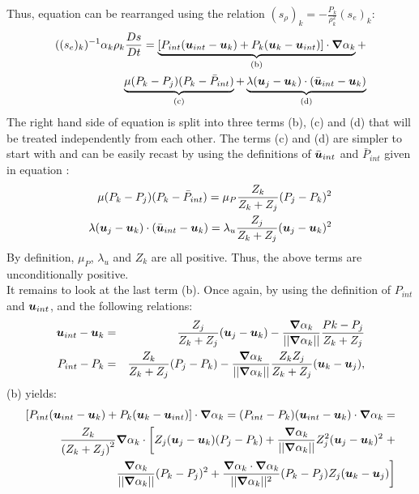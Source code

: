 Thus, equation  can be rearranged using the relation $(s_\rho)_k = - \frac{P_k}{\rho_k^2} (s_e)_k$:
\begin{eqnarray}
\label{eq:ent3}
((s_e)_k)^{-1} \alpha_k \rho_k \frac{Ds}{Dt} = \underbrace{\left[ P_{int} (\boldsymbol u_{int}-\boldsymbol u_k) + P_k (\boldsymbol u_k-\boldsymbol u_{int}) \right] \cdot \boldsymbol{\nabla} \alpha_k}_\textrm{(b)} + \nonumber\\ 
\underbrace{\mu (P_k-P_j)(P_k-\bar{P}_{int})}_\textrm{(c)} + \underbrace{\lambda(\boldsymbol u_j-\boldsymbol u_k)\cdot(\bar{\boldsymbol u}_{int}-\boldsymbol u_k)}_\textrm{(d)}
\end{eqnarray}
The right hand side of equation  is split into three terms (b), (c) and (d) that will be treated independently from each other. The terms (c) and (d) are simpler to start with and can be easily recast by using the definitions of $\bar{\boldsymbol u}_{int}$ and $\bar{P}_{int}$ given in equation :
\begin{eqnarray}
\label{eq:ent4}
\mu (P_k-P_j)(P_k-\bar{P}_{int}) = \mu_P \frac{Z_k}{Z_k+Z_j} (P_j - P_k)^2\nonumber\\
\lambda(\boldsymbol u_j-\boldsymbol u_k)\cdot(\bar{\boldsymbol u}_{int}-\boldsymbol u_k) = \lambda_u \frac{Z_j}{Z_k+Z_j} (\boldsymbol u_j - \boldsymbol u_k)^2 
\end{eqnarray}
By definition, $\mu_P$, $\lambda_u$ and $Z_k$ are all positive. Thus, the above terms are unconditionally positive. \\
It remains to look at the last term (b). Once again, by using the definition of $P_{int}$ and $\boldsymbol u_{int}$, and the following relations:
\begin{eqnarray}
\label{eq:ent4bis}
\boldsymbol u_{int}-\boldsymbol u_k &=& \frac{Z_j}{Z_k+Z_j}(\boldsymbol u_j-\boldsymbol u_k) -  \frac{\boldsymbol{\nabla} \alpha_k}{|| \boldsymbol{\nabla} \alpha_k ||} \frac{Pk-P_j}{Z_k+Z_j} \nonumber\\
P_{int}-P_k &=& \frac{Z_k}{Z_k+Z_j} (P_j-P_k) - \frac{\boldsymbol{\nabla} \alpha_k}{|| \boldsymbol{\nabla} \alpha_k ||} \frac{Z_k Z_j}{Z_k+Z_j} (\boldsymbol u_k-\boldsymbol u_j), \nonumber 
\end{eqnarray}
(b) yields:
\begin{eqnarray}
\label{eq:ent5}
\left[ P_{int} (\boldsymbol u_{int}-\boldsymbol u_k) + P_k (\boldsymbol u_k-\boldsymbol u_{int}) \right] \cdot \boldsymbol{\nabla} \alpha_k = (P_{int}-P_k)(\boldsymbol u_{int}-\boldsymbol u_k)\cdot \boldsymbol{\nabla} \alpha_k=  \nonumber\\ \frac{Z_k}{\left( Z_k+Z_j \right)^2} \boldsymbol{\nabla} \alpha_k \cdot \left[ Z_j (\boldsymbol u_j-\boldsymbol u_k)(P_j-P_k)+\frac{\boldsymbol{\nabla} \alpha_k}{|| \boldsymbol{\nabla} \alpha_k ||} Z_j^2 (\boldsymbol u_j-\boldsymbol u_k)^2 \right. + \nonumber \\ \left. \frac{\boldsymbol{\nabla} \alpha_k}{|| \boldsymbol{\nabla} \alpha_k ||}(P_k-P_j)^2 +  \frac{\boldsymbol{\nabla} \alpha_k \cdot \boldsymbol{\nabla} \alpha_k}{|| \boldsymbol{\nabla} \alpha_k ||^2}(P_k-P_j)Z_j (\boldsymbol u_k-\boldsymbol u_j) \right] 
\end{eqnarray}
